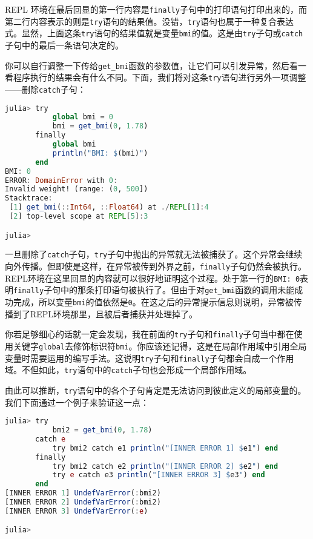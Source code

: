 REPL 环境在最后回显的第一行内容是\verb|finally|子句中的打印语句打印出来的，而第二行内容表示的则是\verb|try|语句的结果值。没错，\verb|try|语句也属于一种复合表达式。显然，上面这条\verb|try|语句的结果值就是变量\verb|bmi|的值。这是由\verb|try|子句或\verb|catch|子句中的最后一条语句决定的。

你可以自行调整一下传给\verb|get_bmi|函数的参数值，让它们可以引发异常，然后看一看程序执行的结果会有什么不同。下面，我们将对这条\verb|try|语句进行另外一项调整——删除\verb|catch|子句：

\begin{lstlisting}[language=julia]
julia> try 
           global bmi = 0
           bmi = get_bmi(0, 1.78)
       finally
           global bmi
           println("BMI: $(bmi)")
       end
BMI: 0
ERROR: DomainError with 0:
Invalid weight! (range: (0, 500])
Stacktrace:
 [1] get_bmi(::Int64, ::Float64) at ./REPL[1]:4
 [2] top-level scope at REPL[5]:3

julia> 
\end{lstlisting}

一旦删除了\verb|catch|子句，\verb|try|子句中抛出的异常就无法被捕获了。这个异常会继续向外传播。但即使是这样，在异常被传到外界之前，\verb|finally|子句仍然会被执行。REPL环境在这里回显的内容就可以很好地证明这个过程。处于第一行的\verb|BMI: 0|表明\verb|finally|子句中的那条打印语句被执行了。但由于对\verb|get_bmi|函数的调用未能成功完成，所以变量\verb|bmi|的值依然是\verb|0|。在这之后的异常提示信息则说明，异常被传播到了REPL环境那里，且被后者捕获并处理掉了。

你若足够细心的话就一定会发现，我在前面的\verb|try|子句和\verb|finally|子句当中都在使用关键字\verb|global|去修饰标识符\verb|bmi|。你应该还记得，这是在局部作用域中引用全局变量时需要运用的编写手法。这说明\verb|try|子句和\verb|finally|子句都会自成一个作用域。不但如此，\verb|try|语句中的\verb|catch|子句也会形成一个局部作用域。

由此可以推断，\verb|try|语句中的各个子句肯定是无法访问到彼此定义的局部变量的。我们下面通过一个例子来验证这一点：

\begin{lstlisting}[language=julia]
julia> try 
           bmi2 = get_bmi(0, 1.78)
       catch e
           try bmi2 catch e1 println("[INNER ERROR 1] $e1") end
       finally
           try bmi2 catch e2 println("[INNER ERROR 2] $e2") end
           try e catch e3 println("[INNER ERROR 3] $e3") end
       end
[INNER ERROR 1] UndefVarError(:bmi2)
[INNER ERROR 2] UndefVarError(:bmi2)
[INNER ERROR 3] UndefVarError(:e)

julia> 
\end{lstlisting}

